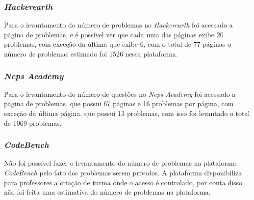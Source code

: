 
\subsubsection{\textit{Hackerearth}}
\label{subsubsec:met_hackerearth}

Para o levantamento do número de problemas no \textit{Hackerearth} foi acessado a página de problemas, e é possível ver que cada uma das páginas exibe 20 problemas, com exceção da última que exibe 6, com o total de  77 páginas o número de problemas estimado foi 1526 nessa plataforma.



\subsubsection{\textit{Neps Academy}}
\label{subsubsec:met_neps_academy}

Para o levantamento do número de questões no \textit{Neps Academy} foi acessado a página de problemas, que possui 67 páginas e 16 problemas por página, com exceção da última página, que possui 13 problemas, com isso foi levantado o total de 1069 problemas.


\subsubsection{\textit{CodeBench}}
\label{subsubsec:met_codebench}

Não foi possível fazer o levantamento do número de problemas na plataforma \textit{CodeBench} pelo fato dos problemas serem privados. A plataforma disponibiliza para professores a criação de turma onde o acesso é controlado, por conta disso não foi feita uma estimativa do número de problemas na plataforma.

